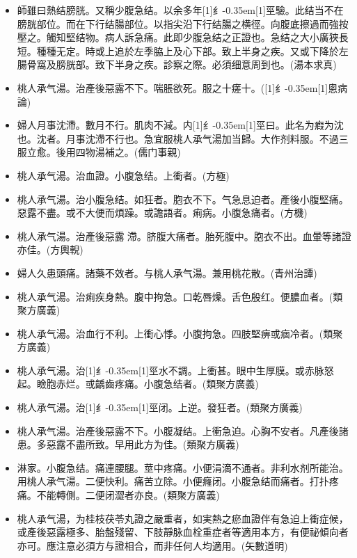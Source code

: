 \documentclass[11pt,oneside,b5paper]{ctexbook}
\begin{document}
\begin{flushleft}
\begin{itemize}
\item 師雖曰熱结膀胱。又稱少腹急结。以余多年{\hbox{\scalebox{0.68}[1]{纟}\kern-0.35em\scalebox{0.64}[1]{巠}}}驗。此结当不在膀胱部位。而在下行结腸部位。以指尖沿下行结腸之横徑。向腹底擦過而強按壓之。觸知堅结物。病人訴急痛。此即少腹急结之正證也。急结之大小廣狹長短。種種无定。時或上追於左季脇上及心下部。致上半身之疾。又或下降於左腸骨窩及膀胱部。致下半身之疾。診察之際。必須细意周到也。(湯本求真)
\item 桃人承气湯。治產後惡露不下。喘脹欲死。服之十瘥十。({\hbox{\scalebox{0.65}[1]{纟}\kern-0.35em\scalebox{0.68}[1]{悤}}}病論)
\item 婦人月事沈滯。數月不行。肌肉不減。内{\hbox{\scalebox{0.68}[1]{纟}\kern-0.35em\scalebox{0.64}[1]{巠}}}曰。此名为瘕为沈也。沈者。月事沈滯不行也。急宜服桃人承气湯加当歸。大作剂料服。不過三服立愈。後用四物湯補之。(儒门事親)
\item 桃人承气湯。治血證。小腹急结。上衝者。(方極)
\item 桃人承气湯。治小腹急结。如狂者。胞衣不下。气急息迫者。產後小腹堅痛。惡露不盡。或不大便而煩躁。或譫語者。痢病。小腹急痛者。(方機)
\item 桃人承气湯。治產後惡露{𬈧}滯。脐腹大痛者。胎死腹中。胞衣不出。血暈等諸證亦佳。(方輿輗)
\item 婦人久患頭痛。諸藥不效者。与桃人承气湯。兼用桃花散。(青州治譚)
\item 桃人承气湯。治痢疾身熱。腹中拘急。口乾唇燥。舌色殷红。便膿血者。(類聚方廣義)
\item 桃人承气湯。治血行不利。上衝心悸。小腹拘急。四肢堅痹或痼冷者。(類聚方廣義)
\item 桃人承气湯。治{\hbox{\scalebox{0.68}[1]{纟}\kern-0.35em\scalebox{0.64}[1]{巠}}}水不調。上衝甚。眼中生厚膜。或赤脉怒起。瞼胞赤烂。或齲齒疼痛。小腹急结者。(類聚方廣義)
\item 桃人承气湯。治{\hbox{\scalebox{0.68}[1]{纟}\kern-0.35em\scalebox{0.64}[1]{巠}}}闭。上逆。發狂者。(類聚方廣義)
\item 桃人承气湯。治產後惡露不下。小腹凝结。上衝急迫。心胸不安者。凡產後諸患。多惡露不盡所致。早用此方为佳。(類聚方廣義)
\item 淋家。小腹急结。痛連腰腿。莖中疼痛。小便涓滴不通者。非利水剂所能治。用桃人承气湯。二便快利。痛苦立除。小便癃闭。小腹急结而痛者。打扑疼痛。不能轉側。二便闭澀者亦良。(類聚方廣義)
\item 桃人承气湯，为桂枝茯苓丸證之嚴重者，如実熱之瘀血證伴有急迫上衝症候，或產後惡露極多、胎盤殘留、下肢靜脉血栓重症者等適用本方，有便祕傾向者亦可。應注意必須方与證相合，而非任何人均適用。(矢數道明)
\end{itemize}


\end{flushleft}
\end{document}
